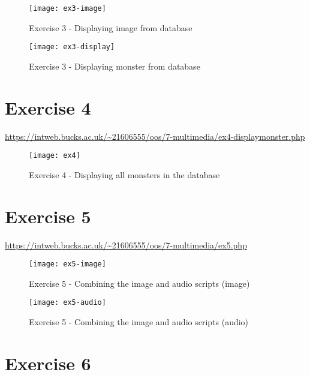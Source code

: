 \captionsetup{type=figure}


\clearpage
\captionsetup{type=figure}


\captionsetup{type=figure}


\begin{figure}[H]
  \caption{Exercise 3 - Displaying image from database}
  \centering
  \texttt{[image: ex3-image]}
\end{figure}

\begin{figure}[H]
  \caption{Exercise 3 - Displaying monster from database}
  \centering
  \texttt{[image: ex3-display]}
\end{figure}

\clearpage
\section{Exercise 4}

\url{https://intweb.bucks.ac.uk/~21606555/oos/7-multimedia/ex4-displaymonster.php}

\captionsetup{type=figure}


\begin{figure}[H]
  \caption{Exercise 4 - Displaying all monsters in the database}
  \centering
  \texttt{[image: ex4]}
\end{figure}

\clearpage
\section{Exercise 5}

\url{https://intweb.bucks.ac.uk/~21606555/oos/7-multimedia/ex5.php}

\captionsetup{type=figure}


\begin{figure}[H]
  \caption{Exercise 5 - Combining the image and audio scripts (image)}
  \centering
  \texttt{[image: ex5-image]}
\end{figure}

\begin{figure}[H]
  \caption{Exercise 5 - Combining the image and audio scripts (audio)}
  \centering
  \texttt{[image: ex5-audio]}
\end{figure}

\clearpage
\section{Exercise 6}
